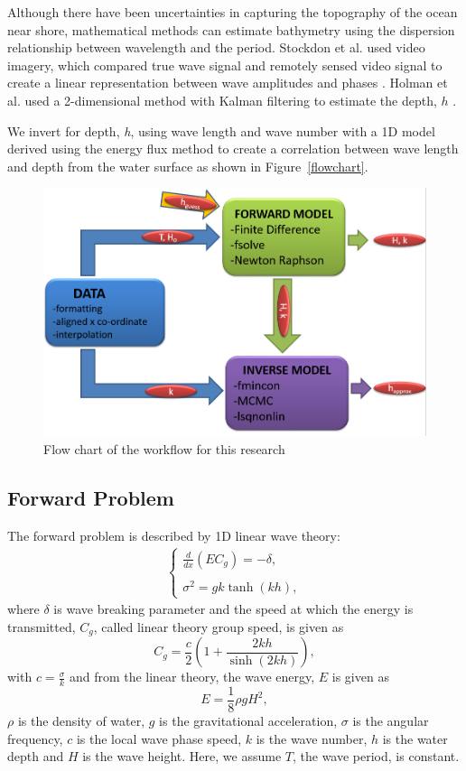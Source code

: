 Although there have been uncertainties in capturing the topography of the ocean near shore, mathematical methods can estimate bathymetry using the dispersion relationship between wavelength and the period. Stockdon et al. used video imagery, which compared true wave signal and remotely sensed video signal to create a linear representation between wave amplitudes and phases \citep{stockdon2000}.  Holman et al. used a 2-dimensional method with Kalman filtering to estimate the depth, $h$ \citep{holman2013}.

We invert for depth, \textit{h}, using wave length and wave number with a 1D model derived using the energy flux method to create a correlation between wave length and depth from the water surface as shown in Figure~\ref{flowchart}.

\begin{figure}[h]
		\centering
		\includegraphics[width=.6\linewidth]{img/Flow_Chart.png}
		\caption{Flow chart of the workflow for this research}
		\label{AWAC}
\end{figure}

\subsection{Forward Problem}\label{forwardproblem}
The forward problem is described by 1D linear wave theory:
\begin{eqnarray}
\label{fp1}
\left \{
\begin{array}{lll}
\frac{d}{dx}\left(EC_g\right)=-\delta,\\
\\
\sigma^2=gk\tanh(kh),
\label{ode}
\end{array}
\right.
\end{eqnarray}
where $\delta$ is  wave breaking parameter and the speed at which the energy is transmitted, $C_g$, called linear theory group speed, is given as
\begin{equation}
\label{cg}
C_g=\frac{c}{2}\left(1+\frac{2kh}{\sinh(2kh)}\right),
\end{equation}
with $c=\frac{\sigma}{k}$ and from the linear theory, the wave energy, $E$ is given as
\begin{equation}
\label{e}
E=\frac{1}{8}\rho g H^2,
\end{equation}
$\rho$ is the density of water, $g$ is the gravitational acceleration, $\sigma$ is the angular frequency, $c$ is the local wave phase speed, $k$ is the wave number, $h$ is the water depth and $H$ is the wave height. Here, we assume $T$, the wave period, is constant.\\ 

